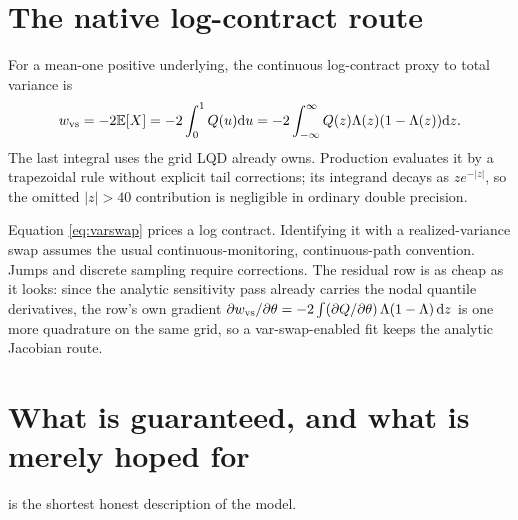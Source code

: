 \documentclass[11pt]{article}
\begin{document}
\section{The native log-contract route}
\label{sec:varswap}

For a mean-one positive underlying, the continuous log-contract proxy to total
variance is
\begin{equation}
w_{\rm vs}=-2\mathbb{E}[X]
=-2\int_0^1Q(u)\mathrm{d} u
=-2\int_{-\infty}^{\infty}
Q(z)\Lambda(z)(1-\Lambda(z))\mathrm{d} z.
\label{eq:varswap}
\end{equation}
The last integral uses the grid LQD already owns.  Production evaluates it by
a trapezoidal rule without explicit tail corrections; its integrand decays as
$z e^{-|z|}$, so the omitted $|z|>40$ contribution is negligible in ordinary
double precision.

Equation \eqref{eq:varswap} prices a log contract.  Identifying it with a
realized-variance swap assumes the usual continuous-monitoring, continuous-path
convention.  Jumps and discrete sampling require corrections.  The residual
row is as cheap as it looks: since the analytic sensitivity pass already
carries the nodal quantile derivatives, the row's own gradient
$\partial w_{\rm vs}/\partial\theta
=-2\int(\partial Q/\partial\theta)\,\Lambda(1-\Lambda)\,\mathrm{d} z$
is one more quadrature on the same grid, so a var-swap-enabled fit keeps the
analytic Jacobian route.

\section{What is guaranteed, and what is merely hoped for}
\label{sec:limits}

 is the shortest honest description of the model.
\end{document}
